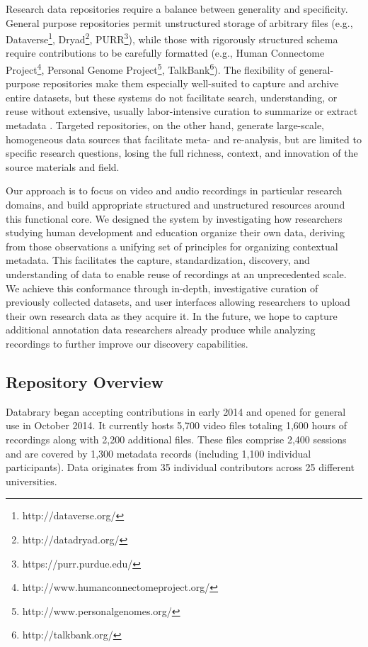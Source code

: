 \documentclass{sig-alternate}
\begin{document}
Research data repositories require a balance between generality and specificity.
General purpose repositories permit unstructured storage of arbitrary files (e.g., Dataverse\footnote{http://dataverse.org/}, Dryad\footnote{http://datadryad.org/}, PURR\footnote{https://purr.purdue.edu/}), while those with rigorously structured schema require contributions to be carefully formatted (e.g., Human Connectome Project\footnote{http://www.humanconnectomeproject.org/}, Per\-son\-al Ge\-nome Pro\-ject\footnote{http://www.personalgenomes.org/}, TalkBank\footnote{http://talkbank.org/}).
The flexibility of general-purpose repositories make them especially well-suited to capture and archive entire datasets, but these systems do not facilitate search, understanding, or reuse without extensive, usually labor-intensive curation to summarize or extract metadata \cite{Peer_2012}.
Targeted repositories, on the other hand, generate large-scale, homogeneous data sources that facilitate meta- and re-analysis, but are limited to specific research questions, losing the full richness, context, and innovation of the source materials and field.

Our approach is to focus on video and audio recordings in particular research domains, and build appropriate structured and unstructured resources around this functional core.
We designed the system by investigating how researchers studying human development and education organize their own data, deriving from those observations a unifying set of principles for organizing contextual metadata.
This facilitates the capture, standardization, discovery, and understanding of data to enable reuse of recordings at an unprecedented scale.
We achieve this conformance through in-depth, investigative curation of previously collected datasets, and user interfaces allowing researchers to upload their own research data as they acquire it.
In the future, we hope to capture additional annotation data researchers already produce while analyzing recordings to further improve our discovery capabilities.

\subsection*{Repository Overview}

Databrary began accepting contributions in early 2014 and opened for general use in October 2014.
It currently hosts 5,700 video files totaling 1,600 hours of recordings along with 2,200 additional files.
These files comprise 2,400 sessions and are covered by 1,300 metadata records (including 1,100 individual participants).
Data originates from 35 individual contributors across 25 different universities.
\end{document}
